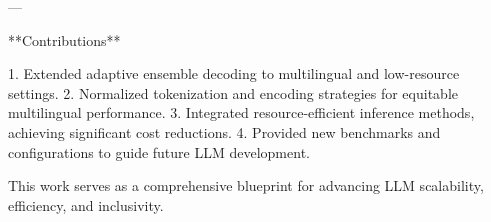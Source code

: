 ---

**Contributions**

1. Extended adaptive ensemble decoding to multilingual and low-resource settings.
2. Normalized tokenization and encoding strategies for equitable multilingual performance.
3. Integrated resource-efficient inference methods, achieving significant cost reductions.
4. Provided new benchmarks and configurations to guide future LLM development.

This work serves as a comprehensive blueprint for advancing LLM scalability, efficiency, and inclusivity.